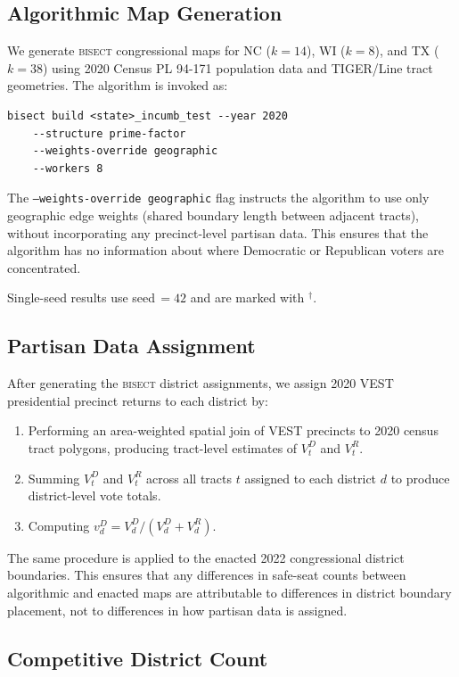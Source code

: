 \label{sec:methodology}

\subsection{Algorithmic Map Generation}

We generate \textsc{bisect} congressional maps for NC ($k=14$), WI ($k=8$), and TX
($k=38$) using 2020 Census PL 94-171 population data and TIGER/Line tract geometries.
The algorithm is invoked as:
\begin{verbatim}
bisect build <state>_incumb_test --year 2020
    --structure prime-factor
    --weights-override geographic
    --workers 8
\end{verbatim}
The \texttt{--weights-override geographic} flag instructs the algorithm to use only
geographic edge weights (shared boundary length between adjacent tracts), without
incorporating any precinct-level partisan data. This ensures that the algorithm has
no information about where Democratic or Republican voters are concentrated.

Single-seed results use seed\,$=42$ and are marked with $^\dagger$.

\subsection{Partisan Data Assignment}

After generating the \textsc{bisect} district assignments, we assign 2020 VEST
presidential precinct returns to each district by:
\begin{enumerate}
  \item Performing an area-weighted spatial join of VEST precincts to 2020 census
    tract polygons, producing tract-level estimates of $V_t^D$ and $V_t^R$.
  \item Summing $V_t^D$ and $V_t^R$ across all tracts $t$ assigned to each district $d$
    to produce district-level vote totals.
  \item Computing $v_d^D = V_d^D / (V_d^D + V_d^R)$.
\end{enumerate}

The same procedure is applied to the enacted 2022 congressional district boundaries.
This ensures that any differences in safe-seat counts between algorithmic and enacted
maps are attributable to differences in district boundary placement, not to differences
in how partisan data is assigned.

\subsection{Competitive District Count}

